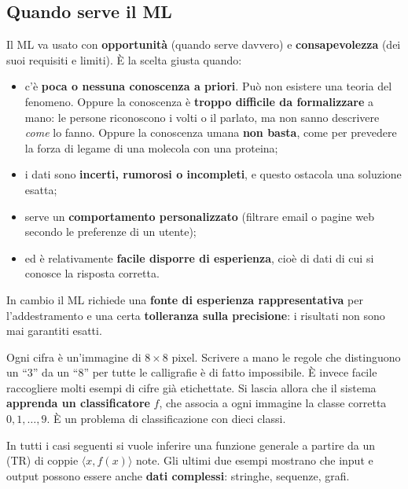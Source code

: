 \subsection{Quando serve il ML}

Il ML va usato con \textbf{opportunità} (quando serve davvero) e \textbf{consapevolezza} (dei suoi requisiti e
limiti). È la scelta giusta quando:
\begin{itemize}
  \item c'è \textbf{poca o nessuna conoscenza a priori}. Può non esistere una teoria del fenomeno. Oppure la
        conoscenza è \textbf{troppo difficile da formalizzare} a mano: le persone riconoscono i volti o il
        parlato, ma non sanno descrivere \emph{come} lo fanno. Oppure la conoscenza umana \textbf{non basta}, come
        per prevedere la forza di legame di una molecola con una proteina;
  \item i dati sono \textbf{incerti, rumorosi o incompleti}, e questo ostacola una soluzione esatta;
  \item serve un \textbf{comportamento personalizzato} (filtrare email o pagine web secondo le preferenze di un
        utente);
  \item ed è relativamente \textbf{facile disporre di esperienza}, cioè di dati di cui si conosce la risposta
        corretta.
\end{itemize}
In cambio il ML richiede una \textbf{fonte di esperienza rappresentativa} per l'addestramento e una certa
\textbf{tolleranza sulla precisione}: i risultati non sono mai garantiti esatti.

\begin{esempio}
Ogni cifra è un'immagine di $8\times 8$ pixel. Scrivere a mano le regole che distinguono un ``3'' da un ``8''
per tutte le calligrafie è di fatto impossibile. È invece facile raccogliere molti esempi di cifre già
etichettate. Si lascia allora che il sistema \textbf{apprenda un classificatore} $f$, che associa a ogni immagine
la classe corretta $0,1,\dots,9$. È un problema di classificazione con dieci classi.
\end{esempio}

In tutti i casi seguenti si vuole inferire una funzione generale a partire da un  (TR) di
coppie $\langle x, f(x)\rangle$ note. Gli ultimi due esempi mostrano che input e output possono essere anche
\textbf{dati complessi}: stringhe, sequenze, grafi.


